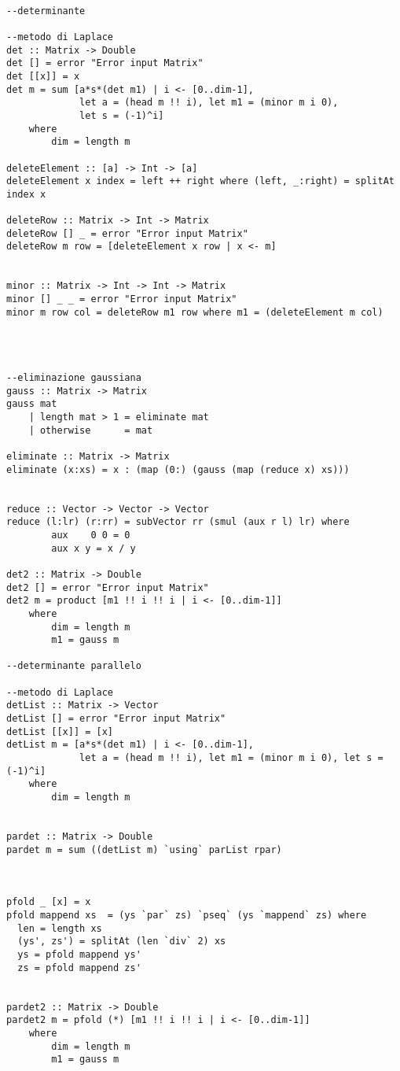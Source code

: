 \begin{verbatim}
                  
--determinante

--metodo di Laplace
det :: Matrix -> Double
det [] = error "Error input Matrix"
det [[x]] = x
det m = sum [a*s*(det m1) | i <- [0..dim-1], 
             let a = (head m !! i), let m1 = (minor m i 0),
             let s = (-1)^i] 
    where
        dim = length m
    
deleteElement :: [a] -> Int -> [a]
deleteElement x index = left ++ right where (left, _:right) = splitAt index x

deleteRow :: Matrix -> Int -> Matrix
deleteRow [] _ = error "Error input Matrix"
deleteRow m row = [deleteElement x row | x <- m]
                        

minor :: Matrix -> Int -> Int -> Matrix
minor [] _ _ = error "Error input Matrix"
minor m row col = deleteRow m1 row where m1 = (deleteElement m col)




--eliminazione gaussiana        
gauss :: Matrix -> Matrix
gauss mat 
    | length mat > 1 = eliminate mat
    | otherwise      = mat

eliminate :: Matrix -> Matrix
eliminate (x:xs) = x : (map (0:) (gauss (map (reduce x) xs)))    


reduce :: Vector -> Vector -> Vector
reduce (l:lr) (r:rr) = subVector rr (smul (aux r l) lr) where
        aux    0 0 = 0
        aux x y = x / y
        
det2 :: Matrix -> Double
det2 [] = error "Error input Matrix"
det2 m = product [m1 !! i !! i | i <- [0..dim-1]]
    where
        dim = length m
        m1 = gauss m

--determinante parallelo

--metodo di Laplace    
detList :: Matrix -> Vector
detList [] = error "Error input Matrix"
detList [[x]] = [x]
detList m = [a*s*(det m1) | i <- [0..dim-1], 
             let a = (head m !! i), let m1 = (minor m i 0), let s = (-1)^i] 
    where
        dim = length m
        

pardet :: Matrix -> Double
pardet m = sum ((detList m) `using` parList rpar)



pfold _ [x] = x
pfold mappend xs  = (ys `par` zs) `pseq` (ys `mappend` zs) where
  len = length xs
  (ys', zs') = splitAt (len `div` 2) xs
  ys = pfold mappend ys'
  zs = pfold mappend zs'
  

pardet2 :: Matrix -> Double
pardet2 m = pfold (*) [m1 !! i !! i | i <- [0..dim-1]]
    where
        dim = length m
        m1 = gauss m
        

\end{verbatim}
